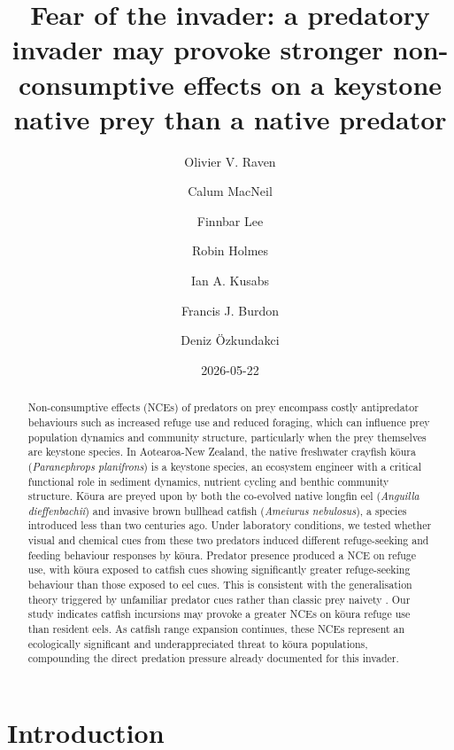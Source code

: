 \documentclass[
  letterpaper,
  DIV=11,
  numbers=noendperiod]{scrartcl}
\title{Fear of the invader: a predatory invader may provoke stronger
non-consumptive effects on a keystone native prey than a native
predator}
\author{Olivier V. Raven \and Calum MacNeil \and Finnbar Lee \and Robin
Holmes \and Ian A. Kusabs \and Francis J. Burdon \and Deniz Özkundakci}
\date{2026-05-22}
\renewcommand*\contentsname{Table of contents}
\newcommand\contentsname{Table of contents}
\begin{document}
\maketitle
\begin{abstract}
Non-consumptive effects (NCEs) of predators on prey encompass costly
antipredator behaviours such as increased refuge use and reduced
foraging, which can influence prey population dynamics and community
structure, particularly when the prey themselves are keystone species.
In Aotearoa-New Zealand, the native freshwater crayfish kōura
(\emph{Paranephrops planifrons}) is a keystone species, an ecosystem
engineer with a critical functional role in sediment dynamics, nutrient
cycling and benthic community structure. Kōura are preyed upon by both
the co-evolved native longfin eel (\emph{Anguilla dieffenbachii}) and
invasive brown bullhead catfish (\emph{Ameiurus nebulosus}), a species
introduced less than two centuries ago. Under laboratory conditions, we
tested whether visual and chemical cues from these two predators induced
different refuge-seeking and feeding behaviour responses by kōura.
Predator presence produced a NCE on refuge use, with kōura exposed to
catfish cues showing significantly greater refuge-seeking behaviour than
those exposed to eel cues. This is consistent with the generalisation
theory triggered by unfamiliar predator cues rather than classic prey
naivety . Our study indicates catfish incursions may provoke a greater
NCEs on kōura refuge use than resident eels. As catfish range expansion
continues, these NCEs represent an ecologically significant and
underappreciated threat to kōura populations, compounding the direct
predation pressure already documented for this invader.
\end{abstract}

\renewcommand*\contentsname{Table of contents}
{
\setcounter{tocdepth}{3}
\tableofcontents
}

\section{Introduction}\label{introduction}
\end{document}
